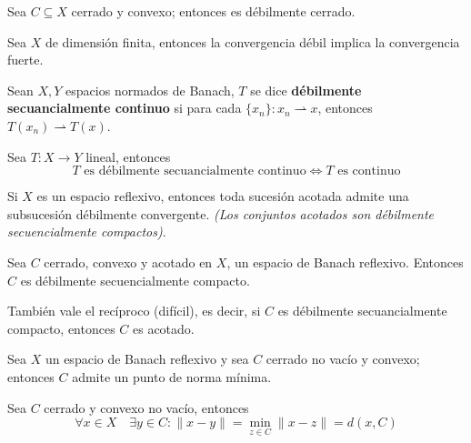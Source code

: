 \documentclass[12pt]{book}
\newcommand{\tbf}{\textbf}
\begin{document}
\begin{coro}
    Sea $C \subseteq X$ cerrado y convexo; entonces es débilmente cerrado.
\end{coro}

\begin{observacion}
    Sea $X$ de dimensión finita, entonces la convergencia débil implica la convergencia fuerte. 
\end{observacion}


\begin{definicion}
    Sean $X, Y$ espacios normados de Banach, $T$ se dice \tbf{débilmente secuancialmente continuo} si para cada $\{x_n\} : x_n \rightharpoonup x$, entonces $T(x_n) \rightharpoonup T(x)$. \\
\end{definicion}

\begin{prop}
    Sea $T: X \longrightarrow Y$ lineal, entonces
    \begin{equation*}
        T \text{ es débilmente secuancialmente continuo} \iff T \text{ es continuo}
    \end{equation*}
\end{prop}

\begin{teo}[Eberlein]
    Si $X$ es un espacio reflexivo, entonces toda sucesión acotada admite una subsucesión débilmente convergente. \textit{\small(Los conjuntos acotados son débilmente secuencialmente compactos)}.
\end{teo}


\begin{coro}
    Sea $C$ cerrado, convexo y acotado en $X$, un espacio de Banach reflexivo. Entonces $C$ es débilmente secuencialmente compacto.
\end{coro}

\begin{observacion}
    También vale el recíproco (difícil), es decir, si $C$ es débilmente secuancialmente compacto, entonces $C$ es acotado.
\end{observacion}


\begin{coro}
    Sea $X$ un espacio de Banach reflexivo y sea $C$ cerrado no vacío y convexo; entonces $C$ admite un punto de norma mínima.
\end{coro}

\begin{coro}
    Sea $C$ cerrado y convexo no vacío, entonces 
    $$\forall x \in X \quad \exists y \in C : \|x - y\| = \min_{z \in C} \|x - z\| = d(x, C)$$
\end{coro}
\end{document}
